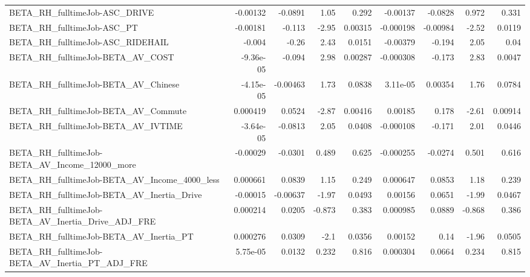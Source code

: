 \begin{tabular}{lrrrrrrrr}
BETA\_RH\_fulltimeJob-ASC\_DRIVE                      &    -0.00132 &      -0.0891 &     1.05 &    0.292 &   -0.00137 &     -0.0828 &        0.972 &         0.331 \\
BETA\_RH\_fulltimeJob-ASC\_PT                         &    -0.00181 &       -0.113 &    -2.95 &  0.00315 &  -0.000198 &    -0.00984 &        -2.52 &        0.0119 \\
BETA\_RH\_fulltimeJob-ASC\_RIDEHAIL                   &      -0.004 &        -0.26 &     2.43 &   0.0151 &   -0.00379 &      -0.194 &         2.05 &          0.04 \\
BETA\_RH\_fulltimeJob-BETA\_AV\_COST                   &   -9.36e-05 &       -0.094 &     2.98 &  0.00287 &  -0.000308 &      -0.173 &         2.83 &        0.0047 \\
BETA\_RH\_fulltimeJob-BETA\_AV\_Chinese                &   -4.15e-05 &     -0.00463 &     1.73 &   0.0838 &   3.11e-05 &     0.00354 &         1.76 &        0.0784 \\
BETA\_RH\_fulltimeJob-BETA\_AV\_Commute                &    0.000419 &       0.0524 &    -2.87 &  0.00416 &    0.00185 &       0.178 &        -2.61 &       0.00914 \\
BETA\_RH\_fulltimeJob-BETA\_AV\_IVTIME                 &   -3.64e-05 &      -0.0813 &     2.05 &   0.0408 &  -0.000108 &      -0.171 &         2.01 &        0.0446 \\
BETA\_RH\_fulltimeJob-BETA\_AV\_Income\_12000\_more      &    -0.00029 &      -0.0301 &    0.489 &    0.625 &  -0.000255 &     -0.0274 &        0.501 &         0.616 \\
BETA\_RH\_fulltimeJob-BETA\_AV\_Income\_4000\_less       &    0.000661 &       0.0839 &     1.15 &    0.249 &   0.000647 &      0.0853 &         1.18 &         0.239 \\
BETA\_RH\_fulltimeJob-BETA\_AV\_Inertia\_Drive          &    -0.00015 &     -0.00637 &    -1.97 &   0.0493 &    0.00156 &      0.0651 &        -1.99 &        0.0467 \\
BETA\_RH\_fulltimeJob-BETA\_AV\_Inertia\_Drive\_ADJ\_FRE  &    0.000214 &       0.0205 &   -0.873 &    0.383 &   0.000985 &      0.0889 &       -0.868 &         0.386 \\
BETA\_RH\_fulltimeJob-BETA\_AV\_Inertia\_PT             &    0.000276 &       0.0309 &     -2.1 &   0.0356 &    0.00152 &        0.14 &        -1.96 &        0.0505 \\
BETA\_RH\_fulltimeJob-BETA\_AV\_Inertia\_PT\_ADJ\_FRE     &    5.75e-05 &       0.0132 &    0.232 &    0.816 &   0.000304 &      0.0664 &        0.234 &         0.815 \\

\end{tabular}
